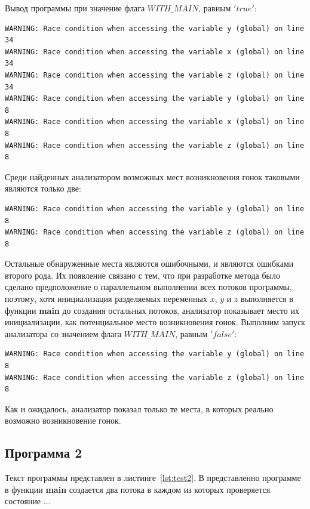 Вывод программы при значение флага $WITH\_MAIN$, равным $'true'$:
\begin{verbatim}
WARNING: Race condition when accessing the variable y (global) on line 34
WARNING: Race condition when accessing the variable x (global) on line 34
WARNING: Race condition when accessing the variable z (global) on line 34
WARNING: Race condition when accessing the variable y (global) on line 8
WARNING: Race condition when accessing the variable x (global) on line 8
WARNING: Race condition when accessing the variable z (global) on line 8
\end{verbatim}
Среди найденных анализатором возможных мест возникновения гонок таковыми являются только две:
\begin{verbatim}
WARNING: Race condition when accessing the variable y (global) on line 8
WARNING: Race condition when accessing the variable z (global) on line 8
\end{verbatim}
Остальные обнаруженные места являются ошибочными, и являются ошибками второго рода. Их появление связано с тем, что при разработке метода было сделано предположение о параллельном выполнении всех потоков программы, поэтому, хотя инициализация разделяемых переменных $x$, $y$ и $z$ выполняется в функции \textbf{main} до создания остальных потоков, анализатор показывает место их инициализации, как потенциальное место возникновения гонок. Выполним запуск анализатора со значением флага $WITH\_MAIN$, равным $'false'$:
\begin{verbatim}
WARNING: Race condition when accessing the variable y (global) on line 8
WARNING: Race condition when accessing the variable z (global) on line 8
\end{verbatim}
Как и ожидалось, анализатор показал только те места, в которых реально возможно возникновение гонок.



\subsection{Программа 2}

Текст программы представлен в листинге~\ref{lst:test2}. В представленно программе в функции \textbf{main} создается два потока в каждом из которых проверяется состояние ...


